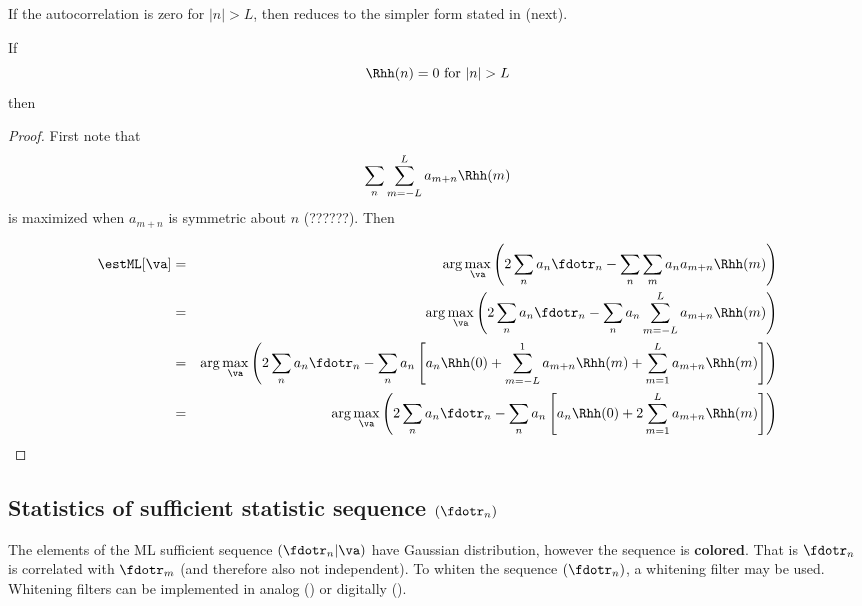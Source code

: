 If the autocorrelation is zero for $|n|>L$, then
 reduces to the simpler form 
stated in  (next).
\begin{corollary}
\label{cor:eq-ml}
If 
   \[ \Rhh(n) = 0 \mbox{ for } |n|>L \]
then 

\end{corollary}
\begin{proof}
First note that 
   \[ \sum_n \sum_{m=-L}^L a_{m+n} \Rhh(m) \]
is maximized when $a_{m+n}$ is symmetric about $n$ (??????). \attention
Then

\begin{eqnarray*}
   \estML[\va ]
     &=&    \arg\max_\va   
            \left( 
             2\sum_n a_n \fdotr_n
            -\sum_n\sum_m a_n a_{m+n} \Rhh(m)
            \right)
   \\&=&    \arg\max_\va   
            \left( 
             2\sum_n a_n \fdotr_n
            -\sum_n a_n \sum_{m=-L}^L a_{m+n} \Rhh(m)
            \right)
   \\&=&    \arg\max_\va   
            \left( 
             2\sum_n a_n \fdotr_n -\sum_n a_n 
             \left[ 
                a_n \Rhh(0) +
                \sum_{m=-L}^1 a_{m+n} \Rhh(m) +
                \sum_{m=1}^L a_{m+n} \Rhh(m)
            \right]
            \right)
   \\&=&    \arg\max_\va   
            \left( 
             2\sum_n a_n \fdotr_n -\sum_n a_n 
             \left[ 
                a_n \Rhh(0) +
                2\sum_{m=1}^L a_{m+n} \Rhh(m)
            \right]
            \right)
\end{eqnarray*}
\end{proof}


\subsection{Statistics of sufficient statistic sequence $(\fdotr_n)$}
The elements of the ML sufficient sequence $(\fdotr_n|\va )$ have
Gaussian distribution, however the sequence is {\bf colored}.
That is $\fdotr_n$ is correlated 
with $\fdotr_m$ (and therefore also not independent).
To whiten the sequence $(\fdotr_n)$, a whitening filter may be used. 
Whitening filters can be implemented in 
analog () or digitally ().

